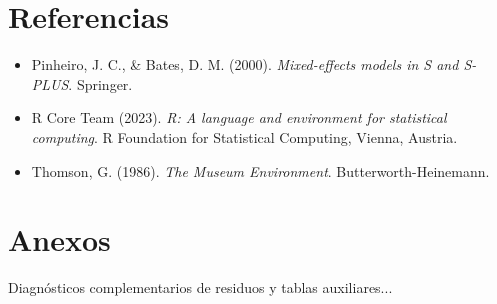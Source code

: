 \documentclass[11pt,a4paper]{article}
\begin{document}
\section{Referencias}
\begin{itemize}
    \item Pinheiro, J. C., \& Bates, D. M. (2000). \textit{Mixed-effects models in S and S-PLUS}. Springer.
    \item R Core Team (2023). \textit{R: A language and environment for statistical computing}. R Foundation for Statistical Computing, Vienna, Austria.
    \item Thomson, G. (1986). \textit{The Museum Environment}. Butterworth-Heinemann.
\end{itemize}

\appendix
\section{Anexos}
Diagnósticos complementarios de residuos y tablas auxiliares...
\end{document}
